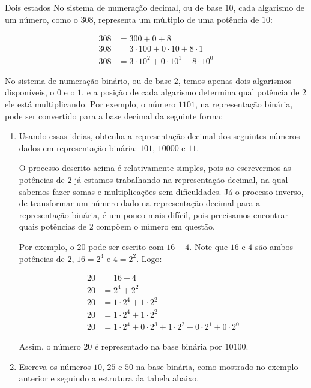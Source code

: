 \clearpage
\begin{task}{Dois estados}
No sistema de numeração decimal, ou de base $10$, cada algarismo de um número, como o $308$, representa um múltiplo de uma potência de $10$:

\begin{align*}
308&=300+0+8\\
308&=3\cdot100+0\cdot10+8\cdot1\\
308&=3\cdot10^2+0\cdot10^1+8\cdot10^0
\end{align*}
 
No sistema de numeração binário, ou de base $2$, temos apenas dois algarismos disponíveis, o $0$ e o $1$, e a posição de cada algarismo determina qual potência de $2$ ele está multiplicando. Por exemplo, o número $1101$, na representação binária, pode ser convertido para a base decimal da seguinte forma:

 
\begin{enumerate}
\item Usando essas ideias, obtenha a representação decimal dos seguintes números dados em representação binária: $101$, $10000$ e $11$.

O processo descrito acima é relativamente simples, pois ao escrevermos as potências de $2$ já estamos trabalhando na representação decimal, na qual sabemos fazer somas e multiplicações sem dificuldades. Já o processo inverso, de transformar um número dado na representação decimal para a representação binária, é um pouco mais difícil, pois precisamos encontrar quais potências de $2$ compõem o número em questão.

Por exemplo, o $20$ pode ser escrito com $16+4$. Note que $16$ e $4$ são ambos potências de $2$, $16=2^4$ e $4=2^2$. Logo:
 
\begin{align*}
20&=16+4\\
20&=2^4+2^2\\
20&=1\cdot2^4+1\cdot2^2\\
20&=1\cdot2^4+1\cdot2^2\\
20&=1\cdot2^4+0\cdot2^3+1\cdot2^2+0\cdot2^1+0\cdot2^0
\end{align*}

Assim, o número $20$ é representado na base binária por $10100$.

\item Escreva os números $10$, $25$ e $50$ na base binária, como mostrado no exemplo anterior e seguindo a estrutura da tabela abaixo.

\begin{table}[H]
\centering


\end{table}
\end{enumerate}
\end{task}
